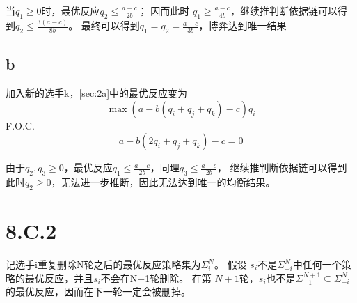 \documentclass[a4paper,12pt]{article}
\begin{document}
当$q_1\ge 0$时，最优反应$q_2\le\frac{a-c}{2b}$；
因而此时 $q_1\ge \frac{a-c}{4b}$，继续推判断依据链可以得到$q_2 \le \frac{3(a-c)}{8b}$。
最终可以得到$q_1=q_2=\frac{a-c}{3b}$，博弈达到唯一结果

\subsection{b}

加入新的选手k，\ref{sec:2a}中的最优反应变为
$$\max (a-b(q_i+q_j+q_k)-c)q_i$$
F.O.C.
$$a-b(2q_i+q_j+q_k)-c=0$$

由于$q_2,q_3\ge 0$，最优反应$q_1\le\frac{a-c}{2b}$，同理$q_3\le\frac{a-c}{2b}$，
继续推判断依据链可以得到此时$q_2\ge 0$，无法进一步推断，因此无法达到唯一的均衡结果。

\section{8.C.2}

记选手i重复删除N轮之后的最优反应策略集为$\Sigma_i^N$。
假设 $s_i$不是$\Sigma_{-i}^N$中任何一个策略的最优反应，并且$s_i$不会在N+1轮删除。
在第 $N+1$轮，$s_i$也不是$\Sigma_{-1}^{N+1}\subseteq \Sigma_{-i}^N$的最优反应，因而在下一轮一定会被删掉。
\end{document}
